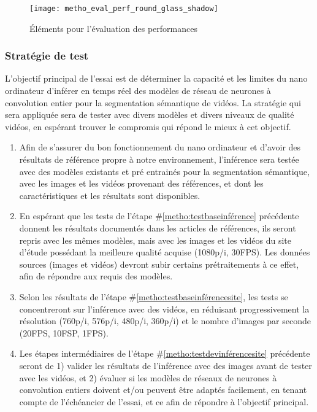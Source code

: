 ﻿\label{metho_eval}
\begin{figure}[H]
    \centering
    \texttt{[image: metho\_eval\_perf\_round\_glass\_shadow]}
    \caption{Éléments pour l'évaluation des performances}
    \label{fig:metho_eval}
\end{figure}
\subsubsection{Stratégie de test}
\par L'objectif principal de l'essai est de déterminer la capacité et les limites du nano ordinateur d'inférer en temps réel des modèles de réseau de neurones à convolution entier pour la segmentation sémantique de vidéos. La stratégie qui sera appliquée sera de tester avec divers modèles et divers niveaux de qualité vidéos, en espérant trouver le compromis qui répond le mieux à cet objectif.
\begin{enumerate}
   \item \label{metho:testbaseinférence} Afin de s'assurer du bon fonctionnement du nano ordinateur et d'avoir des résultats de référence propre à notre environnement, l'inférence sera testée avec des modèles existants et pré entrainés pour la segmentation sémantique, avec les images et les vidéos provenant des références, et dont les caractéristiques et les résultats sont disponibles. 
   \item \label{metho:testbaseinférencesite} En espérant que les tests de l'étape \#\ref{metho:testbaseinférence} précédente donnent les résultats documentés dans les articles de références, ils seront repris avec les mêmes modèles, mais avec les images et les vidéos du site d'étude possédant la meilleure qualité acquise (1080p/i, 30FPS). Les données sources (images et vidéos) devront subir certains prétraitements à ce effet, afin de répondre aux requis des modèles.
   \item \label{metho:testdevinférencesite} Selon les résultats de l'étape \#\ref{metho:testbaseinférencesite}, les tests se concentreront sur l'inférence avec des vidéos, en réduisant progressivement la résolution (760p/i, 576p/i, 480p/i, 360p/i) et le nombre d'images par seconde (20FPS, 10FSP, 1FPS).
   \item Les étapes intermédiaires de l'étape \#\ref{metho:testdevinférencesite} précédente seront de 1) valider les résultats de l'inférence avec des images avant de tester avec les vidéos, et 2) évaluer si les modèles de réseaux de neurones à convolution entiers doivent et/ou peuvent être adaptés facilement, en tenant compte de l'échéancier de l'essai, et ce afin de répondre à l'objectif principal.
\end{enumerate}
